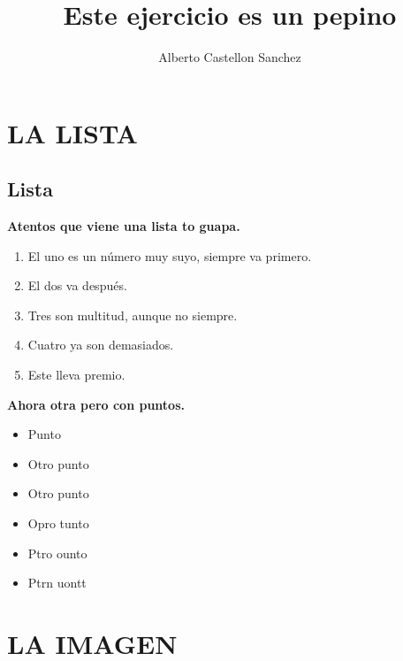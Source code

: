\documentclass[10pt,a4paper]{book}
\author{{\LARGE Alberto Castellon Sanchez}}
\title{{\Huge Este ejercicio es un pepino}}
\begin{document}
\maketitle

\tableofcontents
\part{LA LISTA}
\chapter*{Lista}
{\LARGE \textbf{Atentos que viene una lista to guapa.}}
\\
\begin{enumerate}
\item El uno es un número muy suyo, siempre va primero.\\
\item El dos va después.\\
\item Tres son multitud, aunque no siempre.\\
\item Cuatro ya son demasiados.\\
\item Este lleva premio.\\
\end{enumerate}
{\LARGE \textbf{Ahora otra pero con puntos.}}\\
\begin{itemize}
\item Punto  
\item Otro punto
\item Otro punto
\item Opro tunto
\item Ptro ounto
\item Ptrn uontt
\end{itemize}

\newpage
\part{LA IMAGEN}
\end{document}
